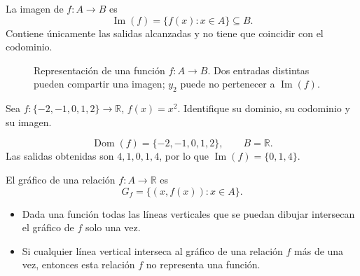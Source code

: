 \begin{definicion}
La imagen de $f:A\to B$ es
\[
\operatorname{Im}(f)=\{f(x):x\in A\}\subseteq B.
\]
Contiene únicamente las salidas alcanzadas y no tiene que coincidir con el codominio.
\end{definicion}

\begin{figure}[H]
\centering
{}
\caption{Representación de una función $f:A\to B$. Dos entradas distintas pueden compartir una imagen; $y_2$ puede no pertenecer a $\operatorname{Im}(f)$.}
\label{fig:diagrama-funcion}
\end{figure}

\begin{ejemplo}
Sea $f:\{-2,-1,0,1,2\}\to\mathbb{R}$, $f(x)=x^2$. Identifique su dominio, su codominio y su imagen.
\end{ejemplo}
\ifmostrarSoluciones
\begin{solucion}
\[
\operatorname{Dom}(f)=\{-2,-1,0,1,2\},\qquad B=\mathbb{R}.
\]
Las salidas obtenidas son $4,1,0,1,4$, por lo que $\operatorname{Im}(f)=\{0,1,4\}$.
\end{solucion}
\else\vspace{12mm}\fi

\begin{definicion}[gráfica de $f$]
El gráfico de una relación $f:A\to\mathbb{R}$ es
\[
G_f=\{(x,f(x)):x\in A\}.
\]
\end{definicion}
\begin{proposicion}
\begin{itemize}
\item Dada una función todas las líneas verticales que se puedan dibujar intersecan el gráfico de $f$ solo una vez. 
\item Si cualquier línea vertical interseca al gráfico de una relación $f$ más de una vez, entonces esta relación $f$ no representa una función.
\end{itemize}
\end{proposicion}

